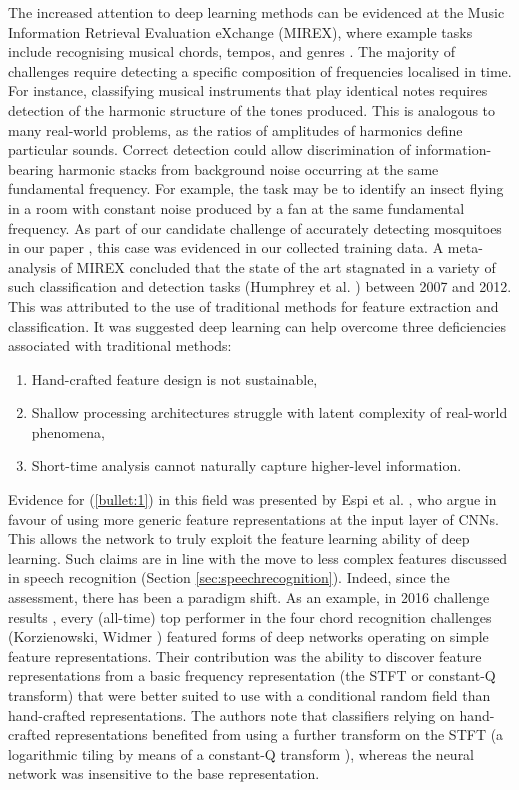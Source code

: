 \documentclass[12pt]{llncs}
\begin{document}
The increased attention to deep learning methods can be evidenced at the Music Information Retrieval Evaluation eXchange (MIREX), where example tasks include recognising musical chords, tempos, and genres \cite{mirex2016}. The majority of challenges require detecting a specific composition of frequencies localised in time. For instance, classifying musical instruments that play identical notes requires detection of the harmonic structure of the tones produced. This is analogous to many real-world problems, as the ratios of amplitudes of harmonics define particular sounds. Correct detection could allow discrimination of information-bearing harmonic stacks from background noise occurring at the same fundamental frequency. For example, the task may be to identify an insect flying in a room with constant noise produced by a fan at the same fundamental frequency. As part of our candidate challenge of accurately detecting mosquitoes in our paper \cite{kiskin2017mosquito}, this case was evidenced in our collected training data.
A meta-analysis of MIREX concluded that the state of the art stagnated in a variety of such classification and detection tasks (Humphrey et al. \cite{humphrey2013feature}) between 2007 and 2012. 
This was attributed to the use of traditional methods for feature extraction and classification. It was suggested deep learning can help overcome three deficiencies associated with traditional methods: 
\begin{enumerate}
    \item Hand-crafted feature design is not sustainable,
    \label{bullet:1}
    \item Shallow processing architectures struggle with latent complexity of real-world phenomena,
    \label{bullet:2}
    \item Short-time analysis cannot naturally capture higher-level information. 
    \label{bullet:3}
\end{enumerate}
Evidence for (\ref{bullet:1}) in this field was presented by Espi et al. \cite{espi2015exploiting}, who argue in favour of using more generic feature representations at the input layer of CNNs. This allows the network to truly exploit the feature learning ability of deep learning. Such claims are in line with the move to less complex features discussed in speech recognition (Section \ref{sec:speechrecognition}).
Indeed, since the assessment, there has been a paradigm shift. As an example, in 2016 challenge results \cite{mirex2016}, every (all-time) top performer in the four chord recognition challenges (Korzienowski, Widmer \cite{korzeniowski2016feature,mirex2016chord}) featured forms of deep networks operating on simple feature representations. Their contribution was the ability to discover feature representations from a basic frequency representation (the STFT or constant-Q transform) that were better suited to use with a conditional random field than hand-crafted representations. The authors note that classifiers relying on hand-crafted representations benefited from using a further transform on the STFT (a logarithmic tiling by means of a constant-Q transform \cite{brown1991calculation}), whereas the neural network was insensitive to the base representation.
\end{document}
